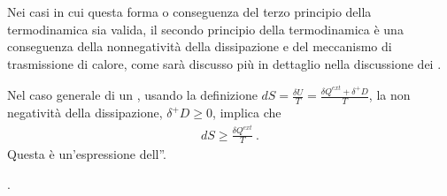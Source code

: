 \documentclass[letterpaper,10pt,italian]{jupyterBook}
\begin{document}
\sphinxAtStartPar
Nei casi in cui questa forma o conseguenza del terzo principio della termodinamica sia valida, il secondo principio della termodinamica è una conseguenza della non\sphinxhyphen{}negatività della dissipazione e del meccanismo di trasmissione di calore, come sarà discusso più in dettaglio nella discussione dei {\hyperref[\detokenize{ch/thermodynamics/principles-second:physics-hs-thermodynamics-principles-second-composite}]{}}.

\sphinxAtStartPar
Nel caso generale di un , usando la definizione \(dS = \frac{\delta U}{T} = \frac{\delta Q^{ext} + \delta^+ D}{T}\), la non negatività della dissipazione, \(\delta^+ D \ge 0\), implica che
\begin{equation*}
\begin{split}d S \ge \frac{\delta Q^{ext}}{T} \ .\end{split}
\end{equation*}
\sphinxAtStartPar
Questa è un’espressione dell”{\hyperref[\detokenize{ch/thermodynamics/principles-second:physics-hs-thermodynamics-foundation-principles-second}]{}}.

\sphinxAtStartPar
{}    .
\end{document}
